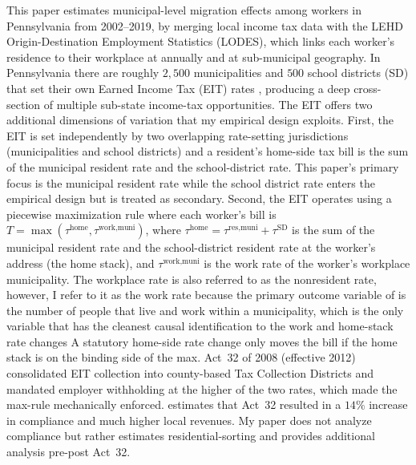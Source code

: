 \documentclass[12pt]{article}
\begin{document}
This paper estimates municipal-level migration effects among workers in Pennsylvania from 2002--2019, by merging local income tax data with the LEHD Origin-Destination
Employment Statistics (LODES), which links each worker's residence to their workplace at annually and at sub-municipal geography. In Pennsylvania there are roughly $2{,}500$ municipalities and $500$ school districts (SD) that set
their own Earned Income Tax (EIT) rates
\citep{bagchiEffectsIntroducingWithholding2022,agrawalLessonsStateLocal},
producing a deep cross-section of multiple sub-state income-tax opportunities. The EIT offers two additional dimensions of variation that my
empirical design exploits. First, the EIT is set independently by two
overlapping rate-setting jurisdictions (municipalities and school
districts) and a resident's home-side tax bill is the sum of the
municipal resident rate and the school-district rate. This paper's primary
focus is the municipal resident rate while the school district rate enters the empirical
design but is treated as secondary.
Second, the EIT operates using a piecewise maximization rule where each worker's bill is
$T = \max(\tau^{\text{home}}, \tau^{\text{work,muni}})$, where
$\tau^{\text{home}} = \tau^{\text{res,muni}} + \tau^{\text{SD}}$ is the
sum of the municipal resident rate and the school-district resident
rate at the worker's address (the home stack), and $\tau^{\text{work,muni}}$ is the
work rate of the worker's workplace municipality. The workplace rate is also referred to as the nonresident rate, however, I refer to it as the work rate because the primary outcome variable of is the number of people that live and work within a municipality, which is the only variable that has the cleanest causal identification to the work and home-stack rate changes A statutory home-side rate
change only moves the bill if the home stack is on the binding side
of the max. Act~32 of 2008 (effective 2012) consolidated EIT
collection into county-based Tax Collection Districts and mandated
employer withholding at the higher of the two rates, which made the
max-rule mechanically enforced.
\citet{bagchiEffectsIntroducingWithholding2022} estimates that Act~32 resulted in a $14 \%$ increase in compliance and much higher local revenues. My paper does not analyze compliance but rather estimates
residential-sorting and provides additional analysis pre-post Act~32.
\end{document}
